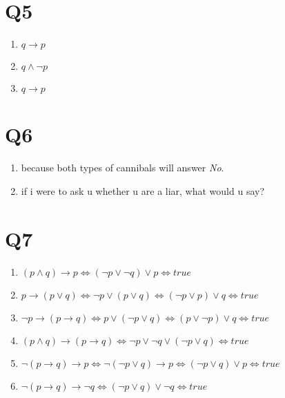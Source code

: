 \documentclass[11pt]{article}
\newenvironment{qparts}{\begin{enumerate}[{(}a{)}]}{\end{enumerate}}
\begin{document}
\section*{Q5}
\begin{qparts}
    \item $q \to p$
    \item $q \land \lnot p$
    \item $q \to p$
\end{qparts}

\section*{Q6}
\begin{qparts}
    \item because both types of cannibals will answer \emph{No}.
    \item if i were to ask u whether u are a liar, what would u say?
\end{qparts}

\section*{Q7}
\begin{qparts}
    
    \item $(p \land q)\to p \iff
    (\lnot p \lor \lnot q)\lor p \iff true $

    
    \item $p \to (p \lor q) \iff \lnot p \lor (p \lor q)
    \iff(\lnot p \lor p) \lor q \iff true$

    
    \item $\lnot p \to  (p \to q) \iff
    p \lor (\lnot p \lor q) \iff(p \lor \lnot p) \lor q
    \iff true$

    
    \item $(p \land q) \to (p \to  q) \iff
    \lnot p \lor \lnot q \lor (\lnot p \lor q) \iff
    true$

    
    \item $\lnot (p \to q)\to p \iff
    \lnot (\lnot p \lor q) \to p 
    \iff
    (\lnot p \lor q) \lor p
    \iff true$
    
    \item $\lnot (p \to q) \to \lnot q 
    \iff (\lnot p \lor q) \lor \lnot q \iff true$
\end{qparts}
\end{document}

